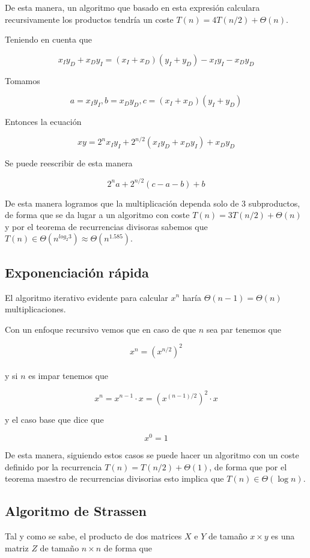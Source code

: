 De esta manera, un algoritmo que basado en esta expresión calculara
recursivamente los productos tendría un coste $T(n) = 4T(n/2) + \Theta(n)$.

Teniendo en cuenta que

$$x_I y_D + x_D y_I = (x_I + x_D)(y_I + y_D) - x_I y_I - x_D y_D$$

Tomamos

$$a = x_I y_I, b = x_D y_D, c = (x_I + x_D)(y_I + y_D)$$

Entonces la ecuación

$$xy = 2^n x_I y_I + 2^{n/2}(x_I y_D + x_D y_I) + x_D y_D$$

Se puede reescribir de esta manera

$$2^n a + 2^{n/2}(c - a - b) + b$$

De esta manera logramos que la multiplicación dependa solo de 3 subproductos,
de forma que se da lugar a un algoritmo con coste $T(n) = 3T(n/2) + \Theta(n)$
y por el teorema de recurrencias divisoras sabemos que $T(n) \in
\Theta(n^{log_2 3}) \approx \Theta(n^{1.585})$.

\subsection{Exponenciación rápida}

El algoritmo iterativo evidente para calcular $x^n$ haría $\Theta(n - 1) =
\Theta(n)$ multiplicaciones.

Con un enfoque recursivo vemos que en caso de que $n$ sea par tenemos que 

$$x^n = (x^{n/2})^2$$\\

y si $n$ es impar tenemos que

$$x^n = x^{n - 1} \cdot x = (x^{(n-1)/2})^2 \cdot x$$

y el caso base que dice que

$$x^0 = 1$$

De esta manera, siguiendo estos casos se puede hacer un algoritmo con un coste
definido por la recurrencia $T(n) = T(n/2) + \Theta(1)$, de forma que por el
teorema maestro de recurrencias divisorias esto implica que $T(n) \in
\Theta(\log n)$.

\subsection{Algoritmo de Strassen}

Tal y como se sabe, el producto de dos matrices $X$ e $Y$ de tamaño $x \times
y$ es una matriz $Z$ de tamaño $n \times n$ de forma que


